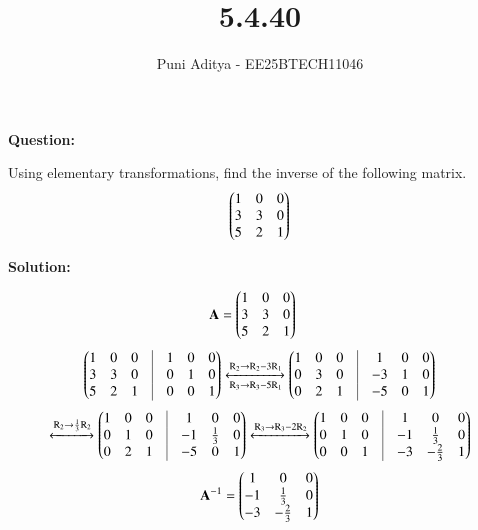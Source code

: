\documentclass[journal]{IEEEtran}
\begin{document}
\title{5.4.40}
\author{Puni Aditya - EE25BTECH11046}
\maketitle

\textbf{Question:}

Using elementary transformations, find the inverse of the following matrix.
\begin{align*}
    \begin{pmatrix}1 & 0 & 0 \\ 3 & 3 & 0 \\ 5 & 2 & 1\end{pmatrix}
\end{align*}

\textbf{Solution:}

\begin{align}
    \mathbf{A} &= \begin{pmatrix}1 & 0 & 0 \\ 3 & 3 & 0 \\ 5 & 2 & 1\end{pmatrix}
\end{align}
\begin{align}
    \myvec{
        1 & 0 & 0 & \vrule & 1 & 0 & 0 \\
        3 & 3 & 0 & \vrule & 0 & 1 & 0 \\
        5 & 2 & 1 & \vrule & 0 & 0 & 1
    }
    \xleftrightarrow[\text{R}_3 \to \text{R}_3 - 5\text{R}_1]{\text{R}_2 \to \text{R}_2 - 3\text{R}_1}
    \myvec{
        1 & 0 & 0 & \vrule & 1 & 0 & 0 \\
        0 & 3 & 0 & \vrule & -3 & 1 & 0 \\
        0 & 2 & 1 & \vrule & -5 & 0 & 1
    }
\end{align}
\begin{align}
    \xleftrightarrow{\text{R}_2 \to \frac{1}{3}\text{R}_2}
    \myvec{
        1 & 0 & 0 & \vrule & 1 & 0 & 0 \\
        0 & 1 & 0 & \vrule & -1 & \frac{1}{3} & 0 \\
        0 & 2 & 1 & \vrule & -5 & 0 & 1
    }
    \xleftrightarrow{\text{R}_3 \to \text{R}_3 - 2\text{R}_2}
    \myvec{
        1 & 0 & 0 & \vrule & 1 & 0 & 0 \\
        0 & 1 & 0 & \vrule & -1 & \frac{1}{3} & 0 \\
        0 & 0 & 1 & \vrule & -3 & -\frac{2}{3} & 1
    }
\end{align}
\begin{align}
    \mathbf{A}^{-1} = \begin{pmatrix}1 & 0 & 0 \\ -1 & \frac{1}{3} & 0 \\ -3 & -\frac{2}{3} & 1\end{pmatrix}
\end{align}
\end{document}
